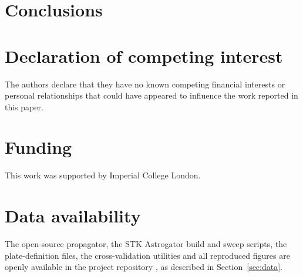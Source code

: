 \documentclass[a4paper,fleqn]{cas-dc}
\begin{document}
\section{Conclusions}
\label{sec:conclusion}


\section*{Declaration of competing interest}
\par\noindent The authors declare that they have no known competing financial interests or personal relationships that could have appeared to influence the work reported in this paper.

\section*{Funding}
\par\noindent This work was supported by Imperial College London.

\section*{Data availability}
\par\noindent The open-source propagator, the STK Astrogator build and sweep scripts, the plate-definition files, the cross-validation utilities and all reproduced figures are openly available in the project repository \citep{svarogPropagatorCode2026}, as described in Section~\ref{sec:data}.






\end{document}
